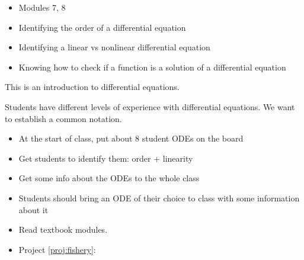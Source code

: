 \begin{lesson}

	\begin{itemize}
		\item Modules 7, 8
	\end{itemize}

	\begin{itemize}
		\item Identifying the order of a differential equation
		\item Identifying a linear vs nonlinear differential equation
		\item Knowing how to check if a function is a solution of a differential equation
	\end{itemize}
	

This is an introduction to differential equations.

Students have different levels of experience with differential equations. We want to establish a common notation.




\begin{annotation}
\begin{goals}
	\begin{itemize}
		\item At the start of class, put about 8 student ODEs on the board
		\item Get students to identify them: order + linearity
		\item Get some info about the ODEs to the whole class
	\end{itemize}
\end{goals}	
\end{annotation}

\begin{itemize}
	\item Students should bring an ODE of their choice to class with some information about it
	\item Read textbook modules.
\end{itemize}


\begin{itemize}
	\item Project \ref{proj:fishery}: \fisherytitle
\end{itemize}




\end{lesson}




